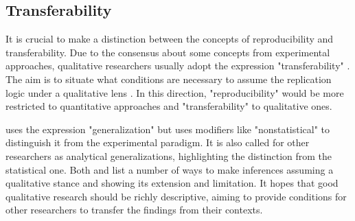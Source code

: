 

                

        

        


\subsection{Transferability}
\label{res-met-ss:transferability}

It is crucial to make a distinction between the concepts of reproducibility and transferability. Due to the consensus about some concepts from experimental approaches, qualitative researchers usually adopt the expression "transferability" \cite{finfgeld:2010}. The aim is to situate what conditions are necessary to assume the replication logic under a qualitative lens \cite[p.365]{tuval:2021}. In this direction, "reproducibility" would be more restricted to quantitative approaches and "transferability" to qualitative ones.

 uses the expression "generalization" but uses modifiers like "nonstatistical" to distinguish it from the experimental paradigm. It is also called for other researchers as analytical generalizations, highlighting the distinction from the statistical one. Both  and \cite{morse:2002} list a number of ways to make inferences assuming a qualitative stance and showing its extension and limitation. It hopes that good qualitative research should be richly descriptive, aiming to provide conditions for other researchers to transfer the findings from their contexts. 

